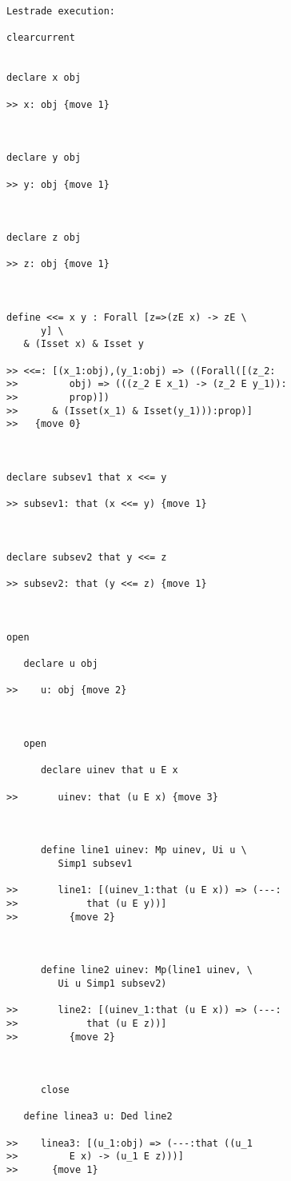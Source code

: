 \documentclass[12pt]{article}
\begin{document}
\begin{verbatim}Lestrade execution:

clearcurrent


declare x obj

>> x: obj {move 1}



declare y obj

>> y: obj {move 1}



declare z obj

>> z: obj {move 1}



define <<= x y : Forall [z=>(zE x) -> zE \
      y] \
   & (Isset x) & Isset y

>> <<=: [(x_1:obj),(y_1:obj) => ((Forall([(z_2:
>>         obj) => (((z_2 E x_1) -> (z_2 E y_1)):
>>         prop)])
>>      & (Isset(x_1) & Isset(y_1))):prop)]
>>   {move 0}



declare subsev1 that x <<= y

>> subsev1: that (x <<= y) {move 1}



declare subsev2 that y <<= z

>> subsev2: that (y <<= z) {move 1}



open

   declare u obj

>>    u: obj {move 2}



   open

      declare uinev that u E x

>>       uinev: that (u E x) {move 3}



      define line1 uinev: Mp uinev, Ui u \
         Simp1 subsev1

>>       line1: [(uinev_1:that (u E x)) => (---:
>>            that (u E y))]
>>         {move 2}



      define line2 uinev: Mp(line1 uinev, \
         Ui u Simp1 subsev2)

>>       line2: [(uinev_1:that (u E x)) => (---:
>>            that (u E z))]
>>         {move 2}



      close

   define linea3 u: Ded line2

>>    linea3: [(u_1:obj) => (---:that ((u_1
>>         E x) -> (u_1 E z)))]
>>      {move 1}




\end{verbatim}
\end{document}
